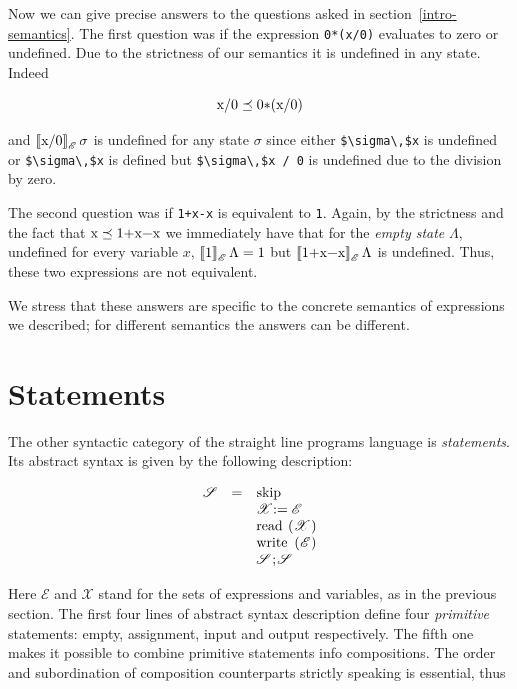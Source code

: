 Now we can give precise answers to the questions asked in section~\ref{intro-semantics}.
The first question was if the expression \lstinline|0*(x/0)| evaluates to zero or undefined. Due to the strictness of our semantics it is undefined in
any state. Indeed

\[
\mbox{\lstinline|x/0|}\preceq \mbox{\lstinline|0*(x/0)|}
\]

and $\sembr{\mbox{\lstinline|x/0|}}^\ph_\mathscr{E}\,\sigma$ is
undefined for any state $\sigma$ since either \lstinline[mathescape=true]|$\sigma\,$x| is undefined or
\lstinline[mathescape=true]|$\sigma\,$x| is defined but \lstinline[mathescape=true]|$\sigma\,$x / 0| is
undefined due to the division by zero.

The second question was if \lstinline|1+x-x| is equivalent to \lstinline|1|. Again, by the strictness and the
fact that $\mbox{\lstinline|x|}\preceq\mbox{\lstinline|1+x-x|}$ we immediately have that for the \emph{empty state}
$\Lambda$, undefined for every variable $x$, $\sembr{1}^\ph_\mathscr{E}\,\Lambda=1$ but $\sembr{\mbox{\lstinline|1+x-x|}}^\ph_\mathscr{E}\,\Lambda$ is undefined.
Thus, these two expressions are not equivalent.

We stress that these answers are specific to the concrete semantics of expressions we described; for different semantics the answers can be different.

\section{Statements}

The other syntactic category of the straight line programs language is \emph{statements}. Its abstract syntax is given by the following
description:

\[
\renewcommand{\arraystretch}{1}
\begin{array}{rcl}  
  \mathscr S & = & \mbox{\lstinline|skip|} \\
             &   & \mathscr X \mbox{\lstinline|:=|} \;\mathscr E \\
             &   & \mbox{\lstinline|read (|} \mathscr X \mbox{\lstinline|)|} \\
             &   & \mbox{\lstinline|write (|} \mathscr E \mbox{\lstinline|)|} \\
             &   & \mathscr S \mbox{\lstinline|;|} \mathscr S
\end{array}
\]

Here $\mathscr E$ and $\mathscr X$ stand for the sets of expressions and variables, as in the previous section. The first four lines of abstract
syntax description define four \emph{primitive} statements: empty, assignment, input and output respectively. The fifth one makes it possible to
combine primitive statements info compositions. The order and subordination of composition counterparts strictly speaking is essential, thus

